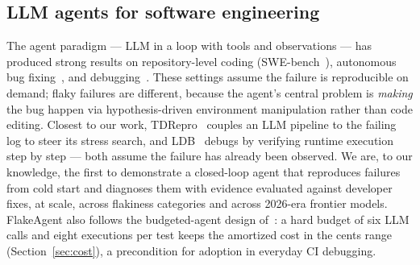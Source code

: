 \subsection{LLM agents for software engineering}

The agent paradigm — LLM in a loop with tools and observations — has produced
strong results on repository-level coding (SWE-bench~\cite{jimenez2024swebench}),
autonomous bug fixing~\cite{zhang2024agentless,zhang2024autocoderover}, and
debugging~\cite{zhang2024llamadebug,kang2023largelang}. These settings assume
the failure is reproducible on demand; flaky failures are different, because
the agent's central problem is \emph{making} the bug happen via
hypothesis-driven environment manipulation rather than code editing. Closest
to our work, TDRepro~\cite{chen2024tdrepro} couples an LLM pipeline to the
failing log to steer its stress search, and LDB~\cite{zhang2024llamadebug}
debugs by verifying runtime execution step by step — both assume the failure
has already been observed. We are, to our knowledge, the first to demonstrate
a closed-loop agent that reproduces failures from cold start and diagnoses
them with evidence evaluated against developer fixes, at scale, across
flakiness categories and across 2026-era frontier models. FlakeAgent also
follows the budgeted-agent design of~\cite{zhang2024agentless}: a hard budget
of six LLM calls and eight executions per test keeps the amortized cost in
the cents range (Section~\ref{sec:cost}), a precondition for adoption in
everyday CI debugging.
